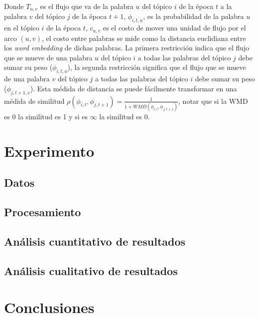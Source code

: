 \documentclass[letterpaper,12pt,oneside]{book} %
\begin{document}
Donde $T_{u,v}$ es el flujo que va de la palabra $u$ del tópico $i$ de la época $t$ a la palabra $v$ del tópico $j$ de la época $t+1$, $\phi_{i,t,u}$, es la probabilidad de la palabra $u$ en el tópico $i$ de la época $t$, $c_{u,v}$ es el costo de mover una unidad de flujo por el arco $(u,v)$, el costo entre palabras se mide como la distancia euclidiana entre los \textit{word embedding} de dichas palabras. La primera restricción indica que el flujo que se mueve de una palabra $u$ del tópico $i$ a todas las palabras del tópico $j$ debe sumar su peso ($\phi_{i,t,u}$), la segunda restricción significa que el flujo que se mueve de una palabra $v$ del tópico $j$ a todas las palabras del tópico $i$ debe sumar su peso ($\phi_{j,t+1,v}$). Esta médida de distancia se puede fácilmente transformar en una médida de similitud $\rho(\phi_{i,t}, \phi_{j,t+1}) = \frac{1}{1+WMD(\phi_{i,t}, \phi_{j,t+1})}$, notar que si la WMD es 0 la similitud es 1 y si es $\infty$ la similitud es 0.



\chapter{Experimento}
\section{Datos}
\section{Procesamiento}

\section{Análisis cuantitativo de resultados}
\section{Análisis cualitativo de resultados}

\chapter{Conclusiones}




\end{document}
